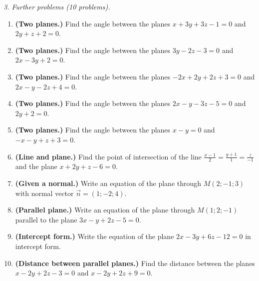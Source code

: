\emph{3. Further problems (10 problems).}
\bigskip
\begin{enumerate}[label=\arabic*., leftmargin=*]
\item \textbf{(Two planes.)} Find the angle between the planes $x+3y+3z-1=0$ and $2y+z+2=0$.
\item \textbf{(Two planes.)} Find the angle between the planes $3y-2z-3=0$ and $2x-3y+2=0$.
\item \textbf{(Two planes.)} Find the angle between the planes $-2x+2y+2z+3=0$ and $2x-y-2z+4=0$.
\item \textbf{(Two planes.)} Find the angle between the planes $2x-y-3z-5=0$ and $2y+2=0$.
\item \textbf{(Two planes.)} Find the angle between the planes $x-y=0$ and $-x-y+z+3=0$.
\item \textbf{(Line and plane.)} Find the point of intersection of the line $\frac{x-1}{2}=\frac{y+1}{1}=\frac{z}{-1}$ and the plane $x+2y+z-6=0$.
\item \textbf{(Given a normal.)} Write an equation of the plane through $M(2;-1;3)$ with normal vector $\vec n=(1;-2;4)$.
\item \textbf{(Parallel plane.)} Write an equation of the plane through $M(1;2;-1)$ parallel to the plane $3x-y+2z-5=0$.
\item \textbf{(Intercept form.)} Write the equation of the plane $2x-3y+6z-12=0$ in intercept form.
\item \textbf{(Distance between parallel planes.)} Find the distance between the planes $x-2y+2z-3=0$ and $x-2y+2z+9=0$.
\end{enumerate}

